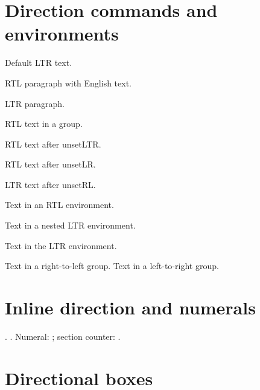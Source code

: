 \documentclass{article}
\makeatletter
\newcommand{\AssertRTL}{%
    \if@RTL\else
    \PackageError{babelbidi-api-core}{Expected RTL direction}{}%
    \fi
}
\newcommand{\AssertLTR}{%
    \if@RTL
    \PackageError{babelbidi-api-core}{Expected LTR direction}{}%
    \fi
}
\makeatother
\begin{document}
    \section{Direction commands and environments}
    Default LTR text.\AssertLTR

    \setRTL\AssertRTL
    RTL paragraph with English text.\par
    \setLTR\AssertLTR
    LTR paragraph.\par

    {\setRL\AssertRTL RTL text in a group.\par}
    \AssertLTR
    {\unsetLTR\AssertRTL RTL text after unsetLTR.\par}
    \AssertLTR
    {\unsetLR\AssertRTL RTL text after unsetLR.\par}
    \AssertLTR
    {\setRTL\AssertRTL\unsetRL\AssertLTR LTR text after unsetRL.\par}
    \AssertLTR
    \setLR\AssertLTR
    \unsetRTL\AssertLTR

    \begin{RTL}
        \AssertRTL Text in an RTL environment.
        \begin{LTR}
            \AssertLTR Text in a nested LTR environment.
        \end{LTR}
        \AssertRTL
    \end{RTL}
    \AssertLTR

    \begin{LTR}
        \AssertLTR Text in the LTR environment.
    \end{LTR}

    \leavevmode\beginR Text in a right-to-left group.\endR
    \beginL Text in a left-to-right group.\endL

    \section{Inline direction and numerals}
     .
     .
    Numeral: ; section counter: .

    \section{Directional boxes}

    \medskip\noindent
\end{document}
